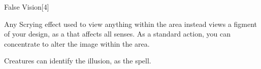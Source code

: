 \begin{spellsection}{False Vision}[4]
    \begin{spellheader}
    \end{spellheader}
    \begin{spellcontent}
        \begin{spelltargetinginfo}
        \end{spelltargetinginfo}
        \begin{spelleffects}
            \spelleffect Any Scrying effect used to view anything within the area instead views a figment of your design, as a  that affects all senses. As a standard action, you can concentrate to alter the image within the area.
            \spelldur \durext \dismissable
        \end{spelleffects}
    \end{spellcontent}
    \begin{spellfooter}
        \spellnotes Creatures can identify the illusion, as the  spell.
    \end{spellfooter}
    \begin{spellaugments}
    \end{spellaugments}
\end{spellsection}

